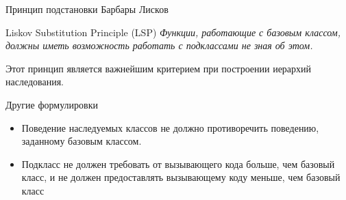\documentclass{beamer}
\begin{document}
\begin{frame}[fragile]{Принцип подстановки Барбары Лисков}
\begin{block}{Liskov Substitution Principle (LSP)} 
\em\centering  Функции, работающие с базовым классом, должны иметь 
    возможность работать с подклассами не зная об этом.
\end{block}
\vspace{5mm}
    
Этот принцип является важнейшим критерием при построении иерархий наследования. 

\begin{block}{Другие формулировки}
\begin{itemize}
    \item Поведение наследуемых классов не должно противоречить поведению,
            заданному базовым классом.
    \item Подкласс не должен требовать от вызывающего кода больше, чем базовый
        класс, и не должен предоставлять вызывающему коду меньше, чем базовый
        класс 
\end{itemize}
\end{block}
\end{frame}
\end{document}
